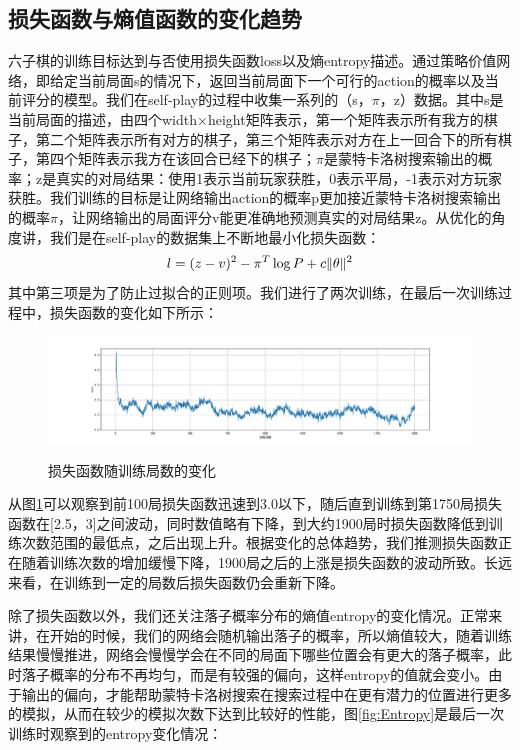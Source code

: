 \documentclass[c5size]{ctexart}
\begin{document}
	\subsection{损失函数与熵值函数的变化趋势}
		六子棋的训练目标达到与否使用损失函数loss以及熵entropy描述。通过策略价值网络，即给定当前局面s的情况下，返回当前局面下一个可行的action的概率以及当前评分的模型。我们在self-play的过程中收集一系列的（s，$\pi$，z）数据。其中s是当前局面的描述，由四个width×height矩阵表示，第一个矩阵表示所有我方的棋子，第二个矩阵表示所有对方的棋子，第三个矩阵表示对方在上一回合下的所有棋子，第四个矩阵表示我方在该回合已经下的棋子；$\pi$是蒙特卡洛树搜索输出的概率；z是真实的对局结果：使用1表示当前玩家获胜，0表示平局，-1表示对方玩家获胜。我们训练的目标是让网络输出action的概率p更加接近蒙特卡洛树搜索输出的概率$\pi$，让网络输出的局面评分v能更准确地预测真实的对局结果z。从优化的角度讲，我们是在self-play的数据集上不断地最小化损失函数：
		\begin{equation}
			l = (z-v)^2-\pi ^T\log P + c\Arrowvert \theta \Arrowvert ^ 2
		\end{equation}
		其中第三项是为了防止过拟合的正则项。我们进行了两次训练，在最后一次训练过程中，损失函数的变化如下所示：
		\begin{figure}
			\caption{损失函数随训练局数的变化}
			\includegraphics[scale=0.4]{Loss.pdf}
			\label{fig:Loss}
		\end{figure}
		从图\ref{fig:Loss}可以观察到前100局损失函数迅速到3.0以下，随后直到训练到第1750局损失函数在[2.5，3]之间波动，同时数值略有下降，到大约1900局时损失函数降低到训练次数范围的最低点，之后出现上升。根据变化的总体趋势，我们推测损失函数正在随着训练次数的增加缓慢下降，1900局之后的上涨是损失函数的波动所致。长远来看，在训练到一定的局数后损失函数仍会重新下降。\par
		除了损失函数以外，我们还关注落子概率分布的熵值entropy的变化情况。正常来讲，在开始的时候，我们的网络会随机输出落子的概率，所以熵值较大，随着训练结果慢慢推进，网络会慢慢学会在不同的局面下哪些位置会有更大的落子概率，此时落子概率的分布不再均匀，而是有较强的偏向，这样entropy的值就会变小。由于输出的偏向，才能帮助蒙特卡洛树搜索在搜索过程中在更有潜力的位置进行更多的模拟，从而在较少的模拟次数下达到比较好的性能，图\ref{fig:Entropy}是最后一次训练时观察到的entropy变化情况：
\end{document}
